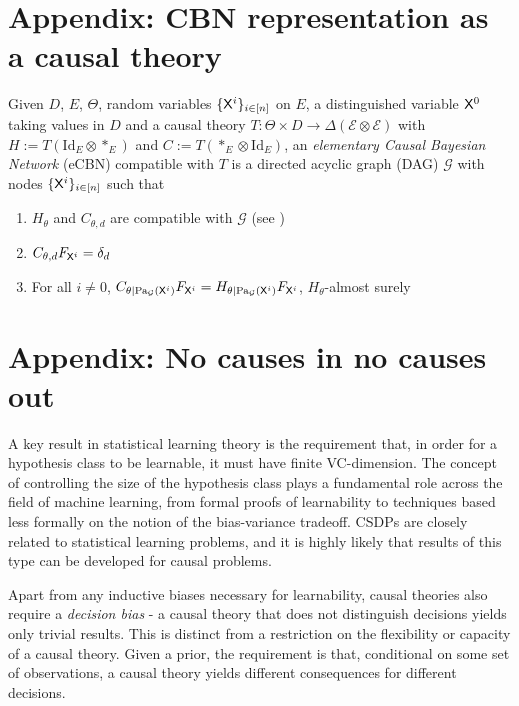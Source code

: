 
\section{Appendix: CBN representation as a causal theory}\label{sec:cbn_as_ct}

\begin{definition}

Given $D$, $E$, $\Theta$, random variables $\{\mathsf{X}^i\}_{i\in [n]}$ on $E$, a distinguished variable $\mathsf{X}^0$ taking values in $D$ and a causal theory $T:\Theta\times D\to \Delta(\mathcal{E}\otimes\mathcal{E})$ with $H:= T(\mathrm{Id}_E\otimes *_E)$ and $C:= T(*_E\otimes \mathrm{Id}_E)$, an \emph{elementary Causal Bayesian Network} (eCBN) compatible with $T$ is a directed acyclic graph (DAG) $\mathcal{G}$ with nodes $\{\mathsf{X}^i\}_{i\in [n]}$ such that

\begin{enumerate}
    \item $H_\theta$ and $C_{\theta,d}$ are compatible with $\mathcal{G}$ (see \citet{pearl_causality:_2009})
    \item $C_{\theta,d} F_{\mathsf{X}^i}=\delta_{d}$
    \item For all $i\neq 0$, $C_{\theta|\text{Pa}_{\mathcal{G}}(\mathsf{X}^i)} F_{\mathsf{X}^i}=H_{\theta|\text{Pa}_{\mathcal{G}}(\mathsf{X}^i)}F_{\mathsf{X}^i} $, $H_\theta$-almost surely
\end{enumerate}
\end{definition}


\section{Appendix: No causes in no causes out}\label{sec:ncinco}

A key result in statistical learning theory is the requirement that, in order for a hypothesis class to be learnable, it must have finite VC-dimension. The concept of controlling the size of the hypothesis class plays a fundamental role across the field of machine learning, from formal proofs of learnability to techniques based less formally on the notion of the bias-variance tradeoff. CSDPs are closely related to statistical learning problems, and it is highly likely that results of this type can be developed for causal problems.

Apart from any inductive biases necessary for learnability, causal theories also require a \emph{decision bias} - a causal theory that does not distinguish decisions yields only trivial results. This is distinct from a restriction on the flexibility or capacity of a causal theory. Given a prior, the requirement is that, conditional on some set of observations, a causal theory yields different consequences for different decisions. 

